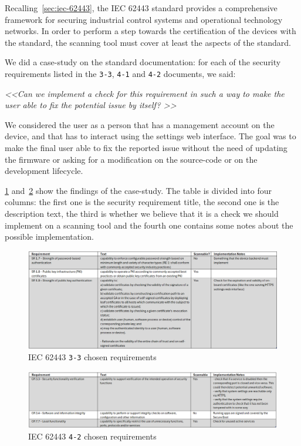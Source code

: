 Recalling~\cref{sec:iec-62443}, the IEC 62443 standard provides a comprehensive framework for securing industrial control systems and operational technology networks. In order to perform a step towards the certification of the devices with the standard, the scanning tool must cover at least the aspects of the standard.

We did a case-study on the standard documentation: for each of the security requirements listed in the \texttt{3-3}, \texttt{4-1} and \texttt{4-2} documents, we said:
\begin{mdframed}
  \textit{\textless\textless  Can we implement a check for this requirement in such a way to make the user able to fix the potential issue by itself? \textgreater\textgreater}
\end{mdframed}
We considered the user as a person that has a management account on the device, and that has to interact using the settings web interface. The goal was to make the final user able to fix the reported issue without the need of updating the firmware or asking for a modification on the source-code or on the development lifecycle.

\cref{fig:iec62443-findings-3_3} and~\cref{fig:iec62443-findings-4_2} show the findings of the case-study. The table is divided into four columns: the first one is the security requirement title, the second one is the description text, the third is whether we believe that it is a check we should implement on a scanning tool and the fourth one contains some notes about the possible implementation.

\begin{figure}[t]
  \centering
  \includegraphics[width=1.0\textwidth]{chapters/04/assets/iec62443-findings-3_3}
  \caption{IEC 62443 \texttt{3-3} chosen requirements}
  \label{fig:iec62443-findings-3_3}
\end{figure}

\begin{figure}[t]
  \centering
  \includegraphics[width=1.0\textwidth]{chapters/04/assets/iec62443-findings-4_2}
  \caption{IEC 62443 \texttt{4-2} chosen requirements}
  \label{fig:iec62443-findings-4_2}
\end{figure}

